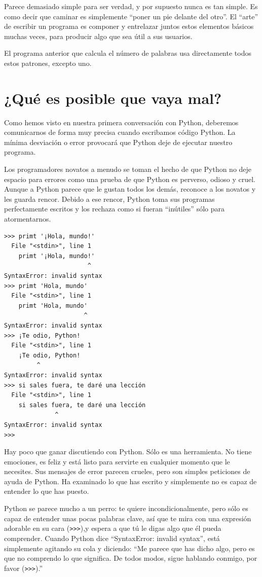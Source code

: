 Parece demasiado simple para ser verdad, y por supuesto nunca es tan simple.
Es como decir que caminar es simplemente
``poner un pie delante del otro''. El ``arte''
de escribir un programa es componer y entrelazar juntos estos
elementos básicos muchas veces, para producir algo
que sea útil a sus usuarios.

El programa anterior que calcula el número de palabras usa directamente
todos estos patrones, excepto uno.

\section{¿Qué es posible que vaya mal?}

Como hemos visto en nuestra primera conversación con Python, deberemos
comunicarnos de forma muy precisa cuando escribamos código Python. La mínima
desviación o error provocará que Python deje de ejecutar
nuestro programa.

Los programadores novatos a menudo se toman el hecho de que Python no
deje espacio para errores como una prueba de que Python es perverso, odioso y cruel.
Aunque a Python parece que le gustan todos los demás, reconoce a los novatos
y les guarda rencor. Debido a ese rencor,
Python toma sus programas perfectamente escritos y los rechaza como si fueran
``inútiles'' sólo para atormentarnos.

\beforeverb
\begin{verbatim}
>>> primt '¡Hola, mundo!'
  File "<stdin>", line 1
    primt '¡Hola, mundo!'
                       ^
SyntaxError: invalid syntax
>>> primt 'Hola, mundo'
  File "<stdin>", line 1
    primt 'Hola, mundo'
                      ^
SyntaxError: invalid syntax
>>> ¡Te odio, Python!
  File "<stdin>", line 1
    ¡Te odio, Python!
         ^
SyntaxError: invalid syntax
>>> si sales fuera, te daré una lección
  File "<stdin>", line 1
    si sales fuera, te daré una lección
              ^
SyntaxError: invalid syntax
>>> 
\end{verbatim}
\afterverb
%
Hay poco que ganar discutiendo con Python. Sólo es una herramienta.
No tiene emociones, es feliz y está listo para servirte en cualquier momento
que le necesites. Sus mensajes de error parecen crueles, pero son simples
peticiones de ayuda de Python. Ha examinado lo que has escrito y simplemente
no es capaz de entender lo que has puesto.

Python se parece mucho a un perro: te quiere incondicionalmente, pero sólo es capaz
de entender unas pocas palabras clave, así que te mira con una expresión
adorable en su cara ({\tt >>>}),y espera a que tú le digas algo que él pueda comprender.
Cuando Python dice ``SyntaxError: invalid syntax'', está simplemente agitando
su cola y diciendo: ``Me parece que has dicho algo, pero es que no comprendo
lo que significa. De todos modos, sigue hablando conmigo, por favor ({\tt >>>}).''


